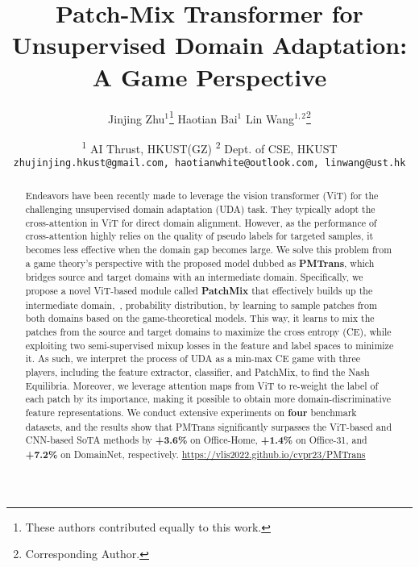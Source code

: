 \documentclass[10pt,twocolumn,letterpaper, ]{article}
\newcommand*{\affmark}[1][*]{\textsuperscript{#1}}
\begin{document}
\title{Patch-Mix Transformer for Unsupervised Domain Adaptation: A Game Perspective}

\author{Jinjing Zhu$^{1}$\thanks{These authors contributed equally to this work. }
\quad
Haotian Bai$^{1}$\footnotemark[1]
\quad
Lin Wang$^{1,2}$\thanks{Corresponding Author.}
\and
\affmark[1] AI Thrust, HKUST(GZ)\quad
\affmark[2] Dept. of CSE, HKUST\\
\quad
{\tt\small zhujinjing.hkust@gmail.com, haotianwhite@outlook.com, linwang@ust.hk}
}

\maketitle
\begin{abstract}
\vspace{-10pt}
Endeavors have been recently made to leverage the vision transformer (ViT) for the challenging unsupervised domain adaptation (UDA) task. They typically adopt the cross-attention in ViT for direct domain alignment. 
However, as the performance of cross-attention highly relies on the quality of pseudo labels for targeted samples, it becomes less effective when the domain gap becomes large. 
We solve this problem from a game theory's perspective with the proposed model dubbed as \textbf{PMTrans}, which bridges source and target domains with an intermediate domain. 
Specifically, we propose a novel ViT-based module called \textbf{PatchMix} that effectively builds up the intermediate domain,~\ie, probability distribution, by learning to sample patches from both domains based on the game-theoretical models.
This way, it learns to mix the patches from the source and target domains to maximize the cross entropy (CE), while exploiting two semi-supervised mixup losses in the feature and label spaces to minimize it.
As such, we interpret the process of UDA as a min-max CE game with three players, including the feature extractor, classifier, and PatchMix, to find the Nash Equilibria. 
Moreover, we leverage attention maps from ViT to re-weight the label of each patch by its importance, making it possible to obtain more domain-discriminative feature representations. We conduct extensive experiments on \textbf{four} benchmark datasets, and the results show that PMTrans significantly surpasses the ViT-based and CNN-based SoTA methods by \textbf{+3.6\%} on Office-Home, \textbf{+1.4\%} on Office-31, and \textbf{+7.2\%} on DomainNet, respectively. \url{https://vlis2022.github.io/cvpr23/PMTrans}
\end{abstract}
\vspace{-18pt}
\end{document}
